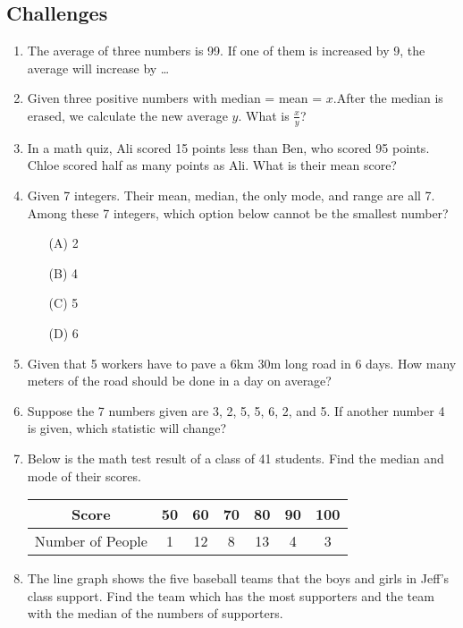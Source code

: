\documentclass[11pt]{scrartcl}
\begin{document}
\subsection{Challenges}
\begin{enumerate}[resume]
    \item The average of three numbers is 99. If one of them is increased by 9, the average will increase by \ldots

    \item Given three positive numbers with median = mean = $x$.After the median is erased, we calculate the new average $y$. What is $\frac{x}{y}$?
    
    \item In a math quiz, Ali scored 15 points less than Ben, who scored 95 points. Chloe scored half as many points as Ali. What is their mean score?

    \item Given 7 integers. Their mean, median, the only mode, and range are all 7. Among these 7 integers, which option below cannot be the smallest number?
    \begin{enumerate}
       \item[(A)] 2
       \item[(B)] 4
       \item[(C)] 5
       \item[(D)] 6
   \end{enumerate}


    \item Given that 5 workers have to pave a 6km 30m long road in 6 days. How many meters of the road should be done in a day on average?

    \item Suppose the 7 numbers given are 3, 2, 5, 5, 6, 2, and 5. If another number 4 is given, which statistic will change?
    
    \item Below is the math test result of a class of 41 students. Find the median and mode of their scores.\\
        \begin{tabular}{c|cccccc}
            \hline
            Score & 50 & 60 & 70 & 80 & 90 & 100\\
            \hline
            Number of People & 1 & 12 & 8 & 13 & 4 & 3\\
            \hline
        \end{tabular}

     \item The line graph shows the five baseball teams that the boys and girls in Jeff's class support. Find the team which has the most supporters and the team with the median of the numbers of supporters.
    

\end{enumerate}
\end{document}
